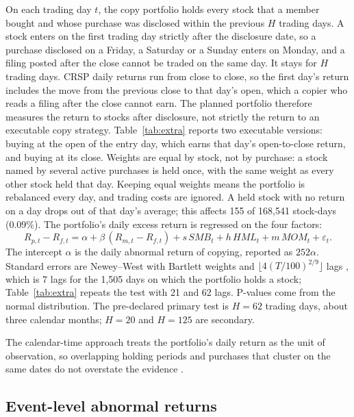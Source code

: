 \documentclass[11pt]{article}
\begin{document}
On each trading day $t$, the copy portfolio holds every stock that a member bought and whose purchase was disclosed within the previous $H$ trading days. A stock enters on the first trading day strictly after the disclosure date, so a purchase disclosed on a Friday, a Saturday or a Sunday enters on Monday, and a filing posted after the close cannot be traded on the same day. It stays for $H$ trading days. CRSP daily returns run from close to close, so the first day's return includes the move from the previous close to that day's open, which a copier who reads a filing after the close cannot earn. The planned portfolio therefore measures the return to stocks after disclosure, not strictly the return to an executable copy strategy. Table~\ref{tab:extra} reports two executable versions: buying at the open of the entry day, which earns that day's open-to-close return, and buying at its close. Weights are equal by stock, not by purchase: a stock named by several active purchases is held once, with the same weight as every other stock held that day. Keeping equal weights means the portfolio is rebalanced every day, and trading costs are ignored. A held stock with no return on a day drops out of that day's average; this affects 155 of 168,541 stock-days (0.09\%). The portfolio's daily excess return is regressed on the four factors:
\begin{equation}
R_{p,t} - R_{f,t} = \alpha + \beta\,(R_{m,t} - R_{f,t}) + s\,\mathit{SMB}_t + h\,\mathit{HML}_t + m\,\mathit{MOM}_t + \varepsilon_t .
\end{equation}
The intercept $\alpha$ is the daily abnormal return of copying, reported as $252\alpha$. Standard errors are Newey--West with Bartlett weights \citep{newey1987simple} and $\lfloor 4(T/100)^{2/9} \rfloor$ lags \citep{newey1994automatic}, which is 7 lags for the 1,505 days on which the portfolio holds a stock; Table~\ref{tab:extra} repeats the test with 21 and 62 lags. P-values come from the normal distribution. The pre-declared primary test is $H = 62$ trading days, about three calendar months; $H = 20$ and $H = 125$ are secondary.

The calendar-time approach treats the portfolio's daily return as the unit of observation, so overlapping holding periods and purchases that cluster on the same dates do not overstate the evidence \citep{fama1998market,mitchell2000managerial}.

\subsection{Event-level abnormal returns}
\end{document}
